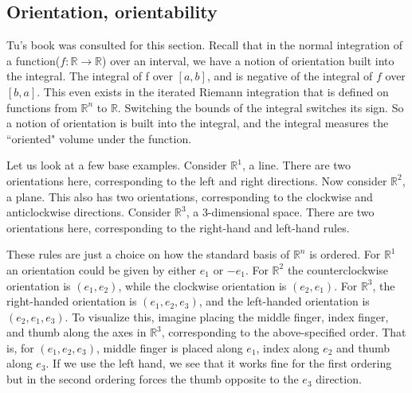 \documentclass{article}
\begin{document}
\subsection{Orientation, orientability}

Tu's book \cite{tu2010introduction} was consulted for this section. Recall that in the normal integration of a function($f: \mathbb{R} \to \mathbb{R}$) over an interval, we have a notion of orientation built into the integral. The integral of f over $[a, b]$, and is negative of the integral of $f$ over $[b, a]$. This even exists in the iterated Riemann integration that is defined on functions from $\mathbb{R}^n$ to $\mathbb{R}$. Switching the bounds of the integral switches its sign. So a notion of orientation is built into the integral, and the integral measures the ``oriented" volume under the function.

Let us look at a few base examples. Consider $\mathbb{R}^1$, a line. There are two orientations here, corresponding to the left and right directions. Now consider $\mathbb{R}^2$, a plane. This also has two orientations, corresponding to the clockwise and anticlockwise directions. Consider $\mathbb{R}^3$, a 3-dimensional space. There are two orientations here, corresponding to the right-hand and left-hand rules. 

These rules are just a choice on how the standard basis of $\mathbb{R}^n$ is ordered. For $\mathbb{R}^1$ an orientation could be given by either $e_1$ or $-e_1$. For $\mathbb{R}^2$ the counterclockwise orientation is $(e_1, e_2)$, while the clockwise orientation is $(e_2, e_1)$. For $\mathbb{R}^3$, the right-handed orientation is $(e_1, e_2, e_3)$, and the left-handed orientation is $(e_2, e_1, e_3)$. To visualize this, imagine placing the middle finger, index finger, and thumb along the axes in $\mathbb{R}^3$, corresponding to the above-specified order. That is, for $(e_1, e_2, e_3)$, middle finger is placed along $e_1$, index along $e_2$ and thumb along $e_3$. If we use the left hand, we see that it works fine for the first ordering but in the second ordering forces the thumb opposite to the $e_3$ direction. 
\end{document}
